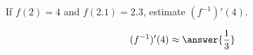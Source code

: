 \documentclass{ximera}
\author{Steven Gubkin}
\begin{document}
\begin{exercise}

If $f(2) = 4$ and $f(2.1) = 2.3$, estimate $(f^{-1})'(4)$.
\begin{prompt}
\[
(f^{-1})'(4) \approx \answer{\frac{1}{3}}
\]
\end{prompt}
\end{exercise}
\end{document}
